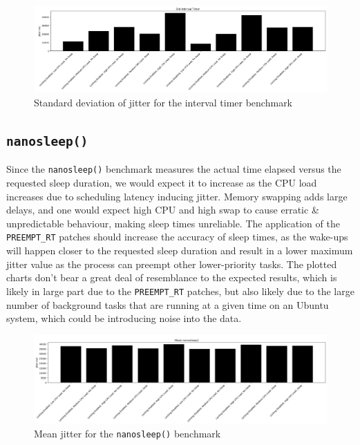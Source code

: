 \documentclass[a4paper]{article}
\begin{document}
\begin{figure}[H]
    \centering
    \includegraphics[width=\textwidth]{./images/interval-std.png}
    \caption{Standard deviation of jitter for the interval timer benchmark}
\end{figure}


\subsection{\texttt{nanosleep()}}
Since the \texttt{nanosleep()} benchmark measures the actual time elapsed versus the requested sleep duration, we would expect it to increase as the CPU load increases due to scheduling latency inducing jitter.
Memory swapping adds large delays, and one would expect high CPU and high swap to cause erratic \& unpredictable behaviour, making sleep times unreliable.
The application of the \verb|PREEMPT_RT| patches should increase the accuracy of sleep times, as the wake-ups will happen closer to the requested sleep duration and result in a lower maximum jitter value as the process can preempt other lower-priority tasks.
The plotted charts don't bear a great deal of resemblance to the expected results, which is likely in large part due to the \verb|PREEMPT_RT| patches, but also likely due to the large number of background tasks that are running at a given time on an Ubuntu system, which could be introducing noise into the data.

\begin{figure}[H]
    \centering
    \includegraphics[width=\textwidth]{./images/nanosleep-mean.png}
    \caption{Mean jitter for the \texttt{nanosleep()} benchmark}
\end{figure}
\end{document}
